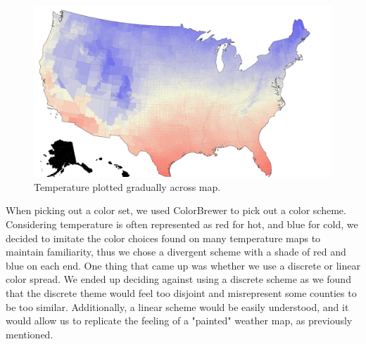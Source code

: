 \documentclass[10pt,twocolumn,twoside]{opticajnl}
\begin{document}
\begin{figure}
	\centering
	\includegraphics[scale=0.15]{images/tempMap.png}
	\caption{Temperature plotted gradually across map.}
\end{figure}

When picking out a color set, we used ColorBrewer \cite{colorbrewer} to pick out a color scheme. Considering temperature is often represented as red for hot, and blue for cold, we decided to imitate the color choices found on many temperature maps to maintain familiarity, thus we chose a divergent scheme with a shade of red and blue on each end. One thing that came up was whether we use a discrete or linear color spread. We ended up deciding against using a discrete scheme as we found that the discrete theme would feel too disjoint and misrepresent some counties to be too similar. Additionally, a linear scheme would be easily understood, and it would allow us to replicate the feeling of a "painted" weather map, as previously mentioned.
\end{document}
